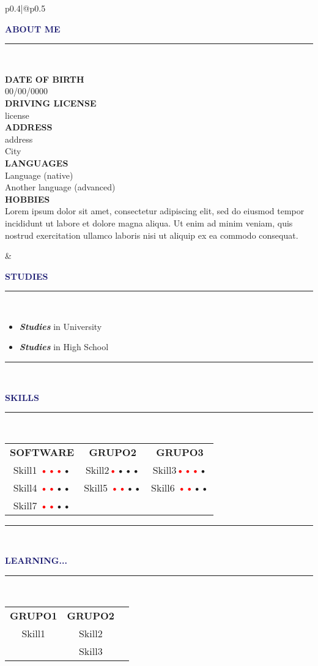 \documentclass[9pt,a4paper]{article}
\newcommand{\myline}[1]{\rule{#1}{1.0pt}\\}
\newcommand{\topic}[1]{\textcolor{MidnightBlue}{\textbf{\Large\selectfont\MakeUppercase{#1}}\\\vspace{-0.5cm}\myline{1.0cm}}}
\newcommand{\uppersubtopicnnl}[1]{\textcolor{MidnightBlue!50}{\textbf{\normalsize\selectfont\MakeUppercase{#1}}}} %
\newcommand{\uppersubtopic}[1]{\uppersubtopicnnl{#1}\\}
\begin{document}
\begin{multicols}{2}
\begin{tabular}{p{0.4\textwidth}|@{\hspace{5mm}}p{0.5\textwidth}}
{\begin{flushleft}
\topic{about me}
\uppersubtopic{date of birth}
00/00/0000\\
\uppersubtopic{driving license}
license\\
\uppersubtopic{address} 
address\\
City\\
\uppersubtopic{languages}
Language (native)\\
Another language (advanced)\\
\uppersubtopic{hobbies}
Lorem ipsum dolor sit amet, consectetur adipiscing elit, sed do eiusmod tempor incididunt ut labore et dolore magna aliqua. Ut enim ad minim veniam, quis nostrud exercitation ullamco laboris nisi ut aliquip ex ea commodo consequat.
\end{flushleft}
}
&
{
\begin{flushleft}
\topic{studies}
\begin{itemize}
	\item{\textit{\textbf{Studies}} in University}
	\item{\textit{\textbf{Studies}} in High School}
\end{itemize}
\textcolor{CornflowerBlue}{\rule{\linewidth}{0.5pt}}\\
\topic{skills}
\begin{center}
\begin{NiceTabular}{>{}c | >{}c | >{}c}
	\uppersubtopicnnl{software} & \uppersubtopicnnl{grupo2} & \uppersubtopicnnl{grupo3}\\
	Skill1 \textcolor{Red}{•••}\textcolor{Red!30}{•} & Skill2\textcolor{Red}{•}\textcolor{Red!30}{•••} & Skill3\textcolor{Red}{•••}\textcolor{Red!30}{•}\\
	Skill4 \textcolor{Red}{••}\textcolor{Red!30}{••} & Skill5 \textcolor{Red}{••}\textcolor{Red!30}{••} & Skill6 \textcolor{Red}{••}\textcolor{Red!30}{••}\\
	Skill7 \textcolor{Red}{••}\textcolor{Red!30}{••} & &\\
\end{NiceTabular}
\end{center}
	
\textcolor{CornflowerBlue}{\rule{\linewidth}{0.5pt}}\\
    
\topic{learning...}
\begin{center}
\begin{NiceTabular}{>{}c | >{}c}
	\uppersubtopicnnl{grupo1} & \uppersubtopic{grupo2}
	Skill1 & Skill2\\
	& Skill3 \\
\end{NiceTabular}
\end{center}


\end{flushleft}}
\end{tabular}
\end{multicols}
\end{document}
